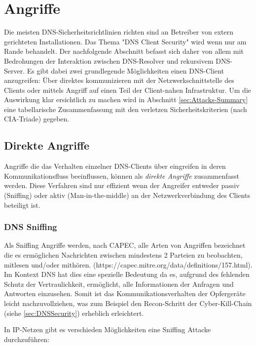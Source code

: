 \chapter{Angriffe}
\label{sec:Attacks}

Die meisten DNS-Sicherheitsrichtlinien richten sind an Betreiber von extern gerichteten Installationen. Das Thema "DNS Client Security" wird wenn nur am Rande behandelt. Der nachfolgende Abschnitt befasst sich daher von allem mit Bedrohungen der Interaktion zwischen DNS-Resolver und rekursivem DNS-Server. 
Es gibt dabei zwei grundlegende Möglichkeiten einen DNS-Client anzugreifen: Über direktes kommunizieren mit der Netzwerkschnittstelle des Clients oder mittels Angriff auf einen Teil der Client-nahen Infrastruktur. Um die Auswirkung klar ersichtlich zu machen wird in Abschnitt \ref{sec:Attacks-Summary} eine tabellarische Zusammenfassung mit den verletzen Sicherheitskriterien (nach CIA-Triade) gegeben. 


\section{Direkte Angriffe}

Angriffe die das Verhalten einzelner DNS-Clients über eingreifen in deren Kommunikationsfluss beeinflussen, können als \textit{direkte Angriffe} zusammenfasst werden. Diese Verfahren sind nur effizient wenn der Angreifer entweder passiv (Sniffing) oder aktiv (Man-in-the-middle) an der Netzwerkverbindung des Clients beteiligt ist. 

\subsection{DNS Sniffing}

Als Sniffing Angriffe werden, nach CAPEC, alle Arten von Angriffen bezeichnet die es ermöglichen Nachrichten zwischen mindestens 2 Parteien zu beobachten, mitlesen und/oder mithören. (https://capec.mitre.org/data/definitions/157.html). Im Kontext DNS hat dies eine spezielle Bedeutung da es, aufgrund des fehlenden Schutz der Vertraulichkeit, ermöglicht, alle Informationen der Anfragen und Antworten einzusehen. Somit ist das Kommunikationsverhalten der Opfergeräte leicht nachzuvollziehen, was zum Beispiel den Recon-Schritt der Cyber-Kill-Chain (siehe \ref{sec:DNSSecurity}) erheblich erleichtert. 

In IP-Netzen gibt es verschieden Möglichkeiten eine Sniffing Attacke durchzuführen: 

